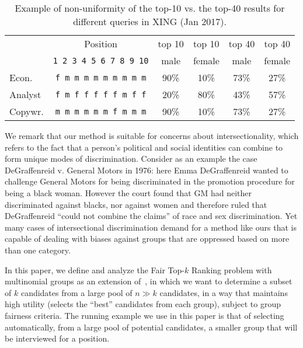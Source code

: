 \begin{table}[t]
	\caption{Example of non-uniformity of the top-10 vs. the top-40 results for different queries in XING (Jan 2017).
		\label{tbl:xing_intro_example}}

	\vspace{-3mm}

	\centering\small\begin{tabular}{lccccc}\toprule
		& Position					  & top 10 & top 10  & top 40 & top 40 \\
		& \texttt{1 2 3 4 5 6 7 8 9 10} & male & female & male & female \\
		\midrule
		Econ.  & \texttt{f m m m m m m m m m} & 90\% & 10\% & 73\% & 27\% \\
		Analyst& \texttt{f m f f f f f m f f} & 20\% & 80\% & 43\% & 57\% \\
		Copywr.& \texttt{m m m m m m f m m m} & 90\% & 10\% & 73\% & 27\% \\
		\bottomrule
	\end{tabular}

	\vspace{-2mm}
\end{table}
%
We remark that our method is suitable for concerns about intersectionality, which refers to the fact that a person's political and social identities can combine to form unique modes of discrimination.
%
Consider as an example the case DeGraffenreid v. General Motors in 1976: here Emma DeGraffenreid wanted to challenge General Motors for being discriminated in the promotion procedure for being a black woman.
%
However the court found that GM had neither discriminated against blacks, nor against women and therefore ruled that DeGraffenreid ``could not combine the claims'' of race and sex discrimination.
%
Yet many cases of intersectional discrimination demand for a method like ours that is capable of dealing with biases against groups that are oppressed based on more than one category.

In this paper, we define and analyze the {\sc Fair Top-$k$ Ranking problem} with multinomial groups as an extension of~\cite{zehlike2017fair}, in which we want to determine a subset of $k$ candidates from a large pool of $n \gg k$ candidates, in a way that maintains high utility (selects the ``best'' candidates from each group), subject to group fairness criteria.
%
The running example we use in this paper is that of selecting automatically, from a large pool of potential candidates, a smaller group that will be interviewed for a position.

